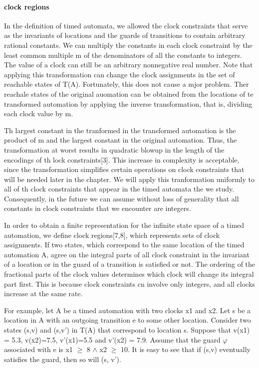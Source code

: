 \paragraph{clock regions}
In the definition	 of timed automata, we allowed the clock constraints that serve as the invariants of locations and the guards of transitions to contain arbitrary rational constants.
We can multiply the constants in each clock constraint by the least common multiple m of the denominators of all the constants to integers. The value of a clock can still be an arbitrary nonnegative real number. Note that applying this transformation can change the clock assignments in the set of reachable states of T(A). Fortunately, this does not cause a mjor problem. Ther reachale states of the original auomation can be obtained from the locations of te transformed automation by applying the inverse transformation, that is, dividing each clock value by m.


Th largest constant in the tranformed in the transformed automation is the product of m and the largest constant in the original automation. Thus, the transformation at worst results in quadratic blowup in the length of the encodings of th lock constraints[3]. This increase in complexity is acceptable, since the transformation simplifies certain operations on clock constraints that will be needed later in the chapter. We will apply this tranformation uniformly to all of th clock constraints that appear in the timed automata the we study. Consequently, in the future we can assume without loss of generality that all constants in clock constraints that we encounter are integers.

In order to obtain a finite representation for the infinite state space of a timed automation, we define clock regions[7,8], which represents sets of clock assignments. If two states, which correspond to the  same location of the timed automation A, agree on the integral parts of all clock constraint in the invariant of a location or in the guard of a transition is satisfied or not. The ordering of the fractional parts of the clock values determines which clock will change its integral part first. This is because clock constraints cn involve only integers, and all clocks increase at the same rate.

For example, let A be a timed automation with two clocks x1 and x2. Let s be a location in A with an outgoing transition e to some other location. Consider two states (s,v) and (s,v') in T(A) that correspond to location s. Suppose that v(x1) = 5.3, v(x2)=7.5, v'(x1)=5.5 and v'(x2) = 7.9. Assume that the guard $\varphi$ associated with e is x1 $\geq$ 8 $\wedge$ x2 $\geq$ 10. It is easy to see that if (s,v) eventually satisfies the guard, then so will (s, v'). \\
\newline

